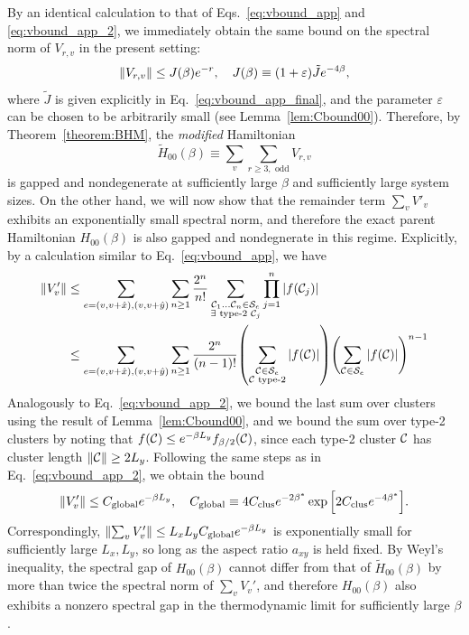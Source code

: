 By an identical calculation to that of Eqs.~\eqref{eq:vbound_app} and \eqref{eq:vbound_app_2}, we immediately obtain the same bound on the spectral norm of $V_{r,v}$ in the present setting:
\begin{equation}
    \norm{V_{r,v}} \leq J(\beta) e^{-r}, \quad J(\beta) \equiv (1 + \varepsilon) \tilde{J} e^{-4\beta} ,
\end{equation}
where $\tilde{J}$ is given explicitly in Eq.~\eqref{eq:vbound_app_final}, and the parameter $\varepsilon$ can be chosen to be arbitrarily small (see Lemma~\ref{lem:Cbound00}). Therefore, by Theorem~\ref{theorem:BHM}, the \emph{modified} Hamiltonian
\begin{equation}
    \widetilde{H}_{00}(\beta) \equiv \sum_{v} \sum_{r \geq 3, \text{ odd}} V_{r, v}
\end{equation}
is gapped and nondegenerate at sufficiently large $\beta$ and sufficiently large system sizes. On the other hand, we will now show that the remainder term $\sum_v V'_v$ exhibits an exponentially small spectral norm, and therefore the exact parent Hamiltonian $H_{00}(\beta)$ is also gapped and nondegnerate in this regime. Explicitly, by a calculation similar to Eq.~\eqref{eq:vbound_app}, we have
\begin{subequations}
    \begin{align}
        \norm{V_v'} &\leq \sum_{e = (v, v + \hat{x}), (v, v + \hat{y})} \sum_{n \geq 1} \frac{2^n}{n!} \sum_{\substack{\mathcal{C}_1 \ldots \mathcal{C}_n \in \mathcal{S}_e \\ \exists \text{ type-2 } \mathcal{C}_j}} \prod_{j = 1}^n \abs{f(\mathcal{C}_j)} \\
        &\leq \sum_{e = (v, v + \hat{x}), (v, v + \hat{y})} \sum_{n \geq 1} \frac{2^n}{(n-1)!} \qty( \sum_{\substack{\mathcal{C} \in \mathcal{S}_e \\ \mathcal{C} \text{ type-2}}} \abs{f(\mathcal{C})} ) \qty( \sum_{\mathcal{C} \in \mathcal{S}_e} \abs{f(\mathcal{C})} )^{n-1}
    \end{align}
\end{subequations}
Analogously to Eq.~\eqref{eq:vbound_app_2}, we bound the last sum over clusters using the result of Lemma~\ref{lem:Cbound00}, and we bound the sum over type-2 clusters by noting that $f(\mathcal{C}) \leq e^{-\beta L_y} f_{\beta / 2}(\mathcal{C})$, since each type-2 cluster $\mathcal{C}$ has cluster length $\norm{\mathcal{C}} \geq 2 L_y$. Following the same steps as in Eq.~\eqref{eq:vbound_app_2}, we obtain the bound
\begin{equation}
    \norm{V'_v} \leq C_{\text{global}} e^{-\beta L_y}, \quad C_{\text{global}} \equiv 4 C_{\mathrm{clus}} e^{-2 \beta^*} \exp \qty[ 2 C_{\mathrm{clus}} e^{-4 \beta^*} ].
\end{equation}
Correspondingly, $\norm{\sum_v V_v'} \leq L_x L_y C_{\text{global}} e^{-\beta L_y}$ is exponentially small for sufficiently large $L_x, L_y$, so long as the aspect ratio $a_{xy}$ is held fixed. By Weyl's inequality, the spectral gap of $H_{00}(\beta)$ cannot differ from that of $\widetilde{H}_{00}(\beta)$ by more than twice the spectral norm of $\sum_v V_v'$, and therefore $H_{00}(\beta)$ also exhibits a nonzero spectral gap in the thermodynamic limit for sufficiently large $\beta$.




